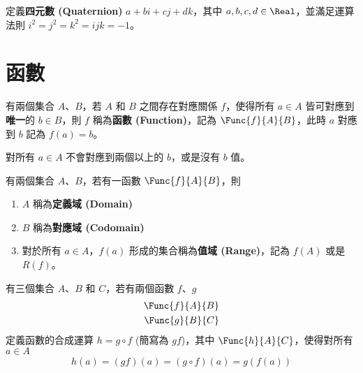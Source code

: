 \documentclass[12pt,a4paper,oneside]{report}
\begin{document}
\begin{CJK}{UTF8}{bkai}
\begin{mydef}[四元數]
定義\textbf{四元數 (Quaternion)} $a+bi+cj+dk$，其中 $a,b,c,d\in{\Real}$，並滿足運算法則 $i^2=j^2=k^2=ijk=-1$。
\end{mydef}

\section{函數}

\begin{mydef}[函數]
\label{def:intro:function_notation}
有兩個集合 $A$、$B$，若 $A$ 和 $B$ 之間存在對應關係 $f$，使得所有 $a\in{A}$ 皆可對應到\textbf{唯一}的 $b\in{B}$，則 $f$ 稱為\textbf{函數 (Function)}，記為 $\Func{f}{A}{B}$，此時 $a$ 對應到 $b$ 記為 $f(a)=b$。
\end{mydef}
\begin{mynote*}
對所有 $a\in{A}$ 不會對應到兩個以上的 $b$，或是沒有 $b$ 值。
\end{mynote*}

\begin{mydef}
\label{def:intro:domain_codomain_and_range}
有兩個集合 $A$、$B$，若有一函數 $\Func{f}{A}{B}$，則
\begin{enumerate}
\item $A$ 稱為\textbf{定義域 (Domain)}
\item $B$ 稱為\textbf{對應域 (Codomain)}
\item 對於所有 $a\in{A}$，$f(a)$ 形成的集合稱為\textbf{值域 (Range)}，記為 $f(A)$ 或是 $R(f)$。
\end{enumerate}
\end{mydef}

\begin{mydef}[函數的合成運算]
\label{def:intro:function_composition}
有三個集合 $A$、$B$ 和 $C$，若有兩個函數 $f$、$g$
\begin{align*}
\Func{f}{A}{B}\\
\Func{g}{B}{C}
\end{align*}
定義函數的合成運算 $h=g\circ{f}$ (簡寫為 $gf$)，其中 $\Func{h}{A}{C}$，使得對所有 $a\in{A}$
\begin{align*}
h(a)={{(gf)}{(a)}}={{({g\circ{f}})}{(a)}}={g({f(a)})}
\end{align*}
\end{mydef}


\end{CJK}
\end{document}
